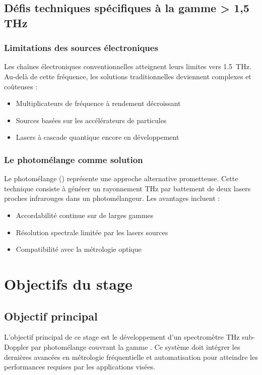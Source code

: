 \subsection{Défis techniques spécifiques à la gamme > 1,5 THz}

\subsubsection{Limitations des sources électroniques}

Les chaînes électroniques conventionnelles atteignent leurs limites vers \SI{1.5}{\THz}. Au-delà de cette fréquence, les solutions traditionnelles deviennent complexes et coûteuses :
\begin{itemize}
    \item Multiplicateurs de fréquence à rendement décroissant
    \item Sources basées sur les accélérateurs de particules
    \item Lasers à cascade quantique encore en développement
\end{itemize}

\subsubsection{Le photomélange comme solution}

Le photomélange (\photomix) représente une approche alternative prometteuse. Cette technique consiste à générer un rayonnement THz par battement de deux lasers proches infrarouges dans un photomélangeur. Les avantages incluent :
\begin{itemize}
    \item Accordabilité continue sur de larges gammes
    \item Résolution spectrale limitée par les lasers sources
    \item Compatibilité avec la métrologie optique
\end{itemize}

\section{Objectifs du stage}

\subsection{Objectif principal}

L'objectif principal de ce stage est le développement d'un spectromètre THz sub-Doppler par photomélange couvrant la gamme \thzrange. Ce système doit intégrer les dernières avancées en métrologie fréquentielle et automatisation pour atteindre les performances requises par les applications visées.

